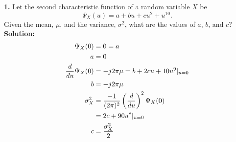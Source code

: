 \textbf{1.} Let the second characteristic function of a random variable $X$ be
  $$ \Psi_X (u ) = a + bu + cu^2 + u^{10} .$$
  Given the mean, $\mu$, and the variance, $\sigma^2$, what are the values of $a$, $b$, and $c$?\\

  \textbf{Solution:}\\

  \begin{align*}
    \Psi_X(0) & = 0 = a\\
            a & = 0 \\
    \dfrac{d}{du} \Psi_X(0) & = -j2\pi \mu = b + 2cu + 10u^9|_{u=0} \\
    b & = -j2\pi \mu \\
    \sigma_X^2 & = \dfrac{-1}{(2\pi)^2} \left( \dfrac{d}{du} \right)^2 \Psi_X(0) \\
              & = 2c + 90u^8|_{u=0} \\
            c & = \dfrac{\sigma_X^2}{2}
  \end{align*}



